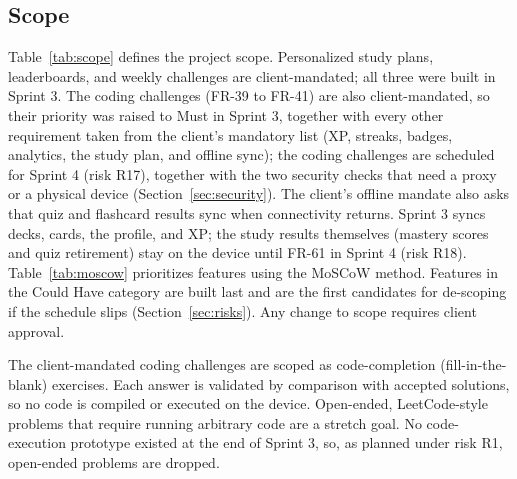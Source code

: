 \documentclass[12pt,letterpaper]{article}
\begin{document}
\subsection{Scope}
Table~\ref{tab:scope} defines the project scope. Personalized study plans,
leaderboards, and weekly challenges are client-mandated; all three were built in
Sprint 3. The coding challenges (FR-39 to FR-41) are also client-mandated, so their
priority was raised to Must in Sprint 3, together with every other requirement taken
from the client's mandatory list (XP, streaks, badges, analytics, the study plan, and
offline sync); the coding challenges are scheduled for Sprint 4
(risk R17), together with the two security checks that need a proxy or a physical
device (Section~\ref{sec:security}). The client's offline mandate also asks that
quiz and flashcard results sync when connectivity returns. Sprint 3 syncs decks,
cards, the profile, and XP; the study results themselves (mastery scores and quiz
retirement) stay on the device until FR-61 in Sprint 4 (risk R18). Table~\ref{tab:moscow}
prioritizes features using the MoSCoW method. Features in the Could Have category are
built last and are the first candidates for de-scoping if the schedule slips
(Section~\ref{sec:risks}). Any change to scope requires client approval.

The client-mandated coding challenges are scoped as code-completion
(fill-in-the-blank) exercises. Each answer is validated by comparison with accepted
solutions, so no code is compiled or executed on the device. Open-ended,
LeetCode-style problems that require running arbitrary code are a stretch goal. No
code-execution prototype existed at the end of Sprint 3, so, as planned under risk R1,
open-ended problems are dropped.
\end{document}
